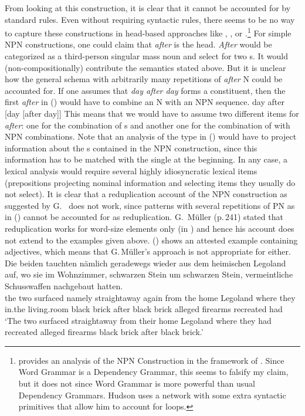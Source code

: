 \documentclass[output=paper,biblatex,babelshorthands,newtxmath,draftmode,colorlinks,citecolor=brown]{langscibook}
\begin{document}
From looking at this construction, it is clear that it cannot be accounted for by standard \xbar
rules. Even without requiring \xbar syntactic rules, there seems to be no way to capture these
constructions in head-based approaches like \minimalism, \cg, or \dg.\footnote{%
  \crossrefchaptert[\page \pageref{dg:page-npn-construction}]{dg} provides an analysis of the NPN Construction in the framework of . Since Word Grammar is a Dependency Grammar, this seems to falsify my claim, but it does not since Word Grammar is more powerful
  than usual Dependency Grammars. Hudson uses a network with some extra syntactic primitives that
  allow him to account for loops.
} For simple NPN constructions,
one could claim that \emph{after} is the head. \emph{After} would be categorized as a third-person singular
mass noun and select for two \nbar{}s. It would (non-compositionally) contribute the semantics stated above. But it is unclear how the general schema with arbitrarily
many repetitions of \emph{after} N could be accounted for. If one assumes that \emph{day after day}
forms a constituent, then the first \emph{after} in () would have to combine an N with an NPN sequence.
\ea
day after [day [after day]]
\z
This means that we would have to assume two different items for \emph{after}: one for the
combination of \nbar{}s and another one for the combination of \nbar with NPN combinations. Note
that an analysis of the type in () would have to project information about the \nbar{}s contained
in the NPN construction, since this information has to be matched with the single \nbar at the
beginning. In any case, a lexical analysis would require several highly idiosyncratic lexical items
(prepositions projecting nominal information and selecting items they usually do not select).
It is clear that a reduplication account of the NPN construction as suggested by
G.\ \citet{GMueller2011a} does not work, since patterns with several repetitions of PN as in
() cannot be accounted for as reduplication. G.\ Müller (p.\,241) stated that reduplication works
for word-size elements only (in ) and hence his account does not extend to the 
examples given above. () shows an attested  example containing adjectives, which means
that G.\,Müller's approach is not appropriate for  either.
\ea
\label{ex-schwarzen-stein}
\gll Die beiden tauchten nämlich geradewegs wieder aus dem heimischen Legoland auf, wo sie im
Wohnzimmer, schwarzen Stein um schwarzen Stein, vermeintliche Schusswaffen nachgebaut
hatten.\footnotemark\\
     the two    surfaced namely straightaway again   from the home Legoland \particle{} where they
     in.the living.room black brick after black brick alleged firearms recreated had\\%
{}
\glt `The two surfaced straightaway from their home Legoland where they had recreated alleged
firearms black brick after black brick.'
\z
\end{document}

